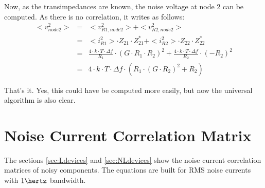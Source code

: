 Now, as the transimpedances are known, the noise voltage
at node 2 can be computed. As there is no correlation, it writes
as follows:
\begin{eqnarray}
<v_{node2}^2> & = & <v_{R1,node2}^2> + <v_{R2,node2}^2> \\
  & = & <i_{R1}^2>\cdot Z_{21}\cdot Z_{21}^* + <i_{R2}^2>\cdot Z_{22}\cdot Z_{22}^* \\
  & = & \frac{4\cdot k\cdot T\cdot \Delta f}{R_1} \cdot (G\cdot R_1\cdot R_2)^2 +
        \frac{4\cdot k\cdot T\cdot \Delta f}{R_2} \cdot (-R_2)^2 \\
  & = & 4\cdot k\cdot T\cdot \Delta f\cdot \left( R_1\cdot (G\cdot R_2)^2 + R_2 \right)
\end{eqnarray}

That's it. Yes, this could have be computed more easily, but now
the universal algorithm is also clear.

\section{Noise Current Correlation Matrix}

The sections \ref{sec:Ldevices} and \ref{sec:NLdevices} show the
noise current correlation matrices of noisy components.  The
equations are built for RMS noise currents with $1\hertz$ bandwidth.
